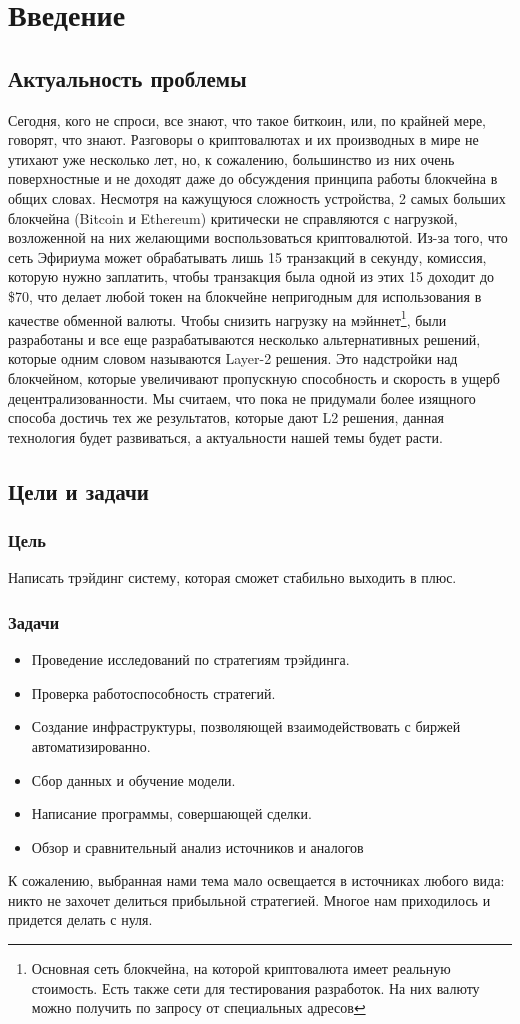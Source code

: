 \section{Введение}

\subsection{Актуальность проблемы}
Сегодня, кого не спроси, все знают, что такое биткоин, или, по крайней мере, говорят, что знают. Разговоры о криптовалютах и их производных в мире не утихают уже несколько лет, но, к сожалению, большинство из них очень поверхностные и не доходят даже до обсуждения принципа работы блокчейна в общих словах.
Несмотря на кажущуюся сложность устройства, 2 самых больших блокчейна (Bitcoin и Ethereum) критически не справляются с нагрузкой, возложенной на них желающими воспользоваться криптовалютой. Из-за того, что сеть Эфириума может обрабатывать лишь 15 транзакций в секунду, комиссия, которую нужно заплатить, чтобы транзакция была одной из этих 15 доходит до \$70, что делает любой токен на блокчейне непригодным для использования в качестве обменной валюты. Чтобы снизить нагрузку на мэйннет\footnote{Основная сеть блокчейна, на которой криптовалюта имеет реальную стоимость. Есть также сети для тестирования разработок. На них валюту можно получить по запросу от специальных адресов}, были разработаны и все еще разрабатываются несколько альтернативных решений, которые одним словом называются Layer-2 решения. Это надстройки над блокчейном, которые увеличивают пропускную способность и скорость в ущерб децентрализованности.
Мы считаем, что пока не придумали более изящного способа достичь тех же результатов, которые дают L2 решения, данная технология будет развиваться, а актуальности нашей темы будет расти.

\subsection{Цели и задачи}
\subsubsection{Цель}
Написать трэйдинг систему, которая сможет стабильно выходить в плюс.
\subsubsection{Задачи}
\begin{itemize}
\item Проведение исследований по стратегиям трэйдинга.
\item Проверка работоспособность стратегий.
\item Создание инфраструктуры, позволяющей взаимодействовать с биржей автоматизированно.
\item Сбор данных и обучение модели.
\item Написание программы, совершающей сделки.
\item Обзор и сравнительный анализ источников и аналогов
\end{itemize}
К сожалению, выбранная нами тема мало освещается в источниках любого вида: никто не захочет делиться прибыльной стратегией. Многое нам приходилось и придется делать с нуля.

